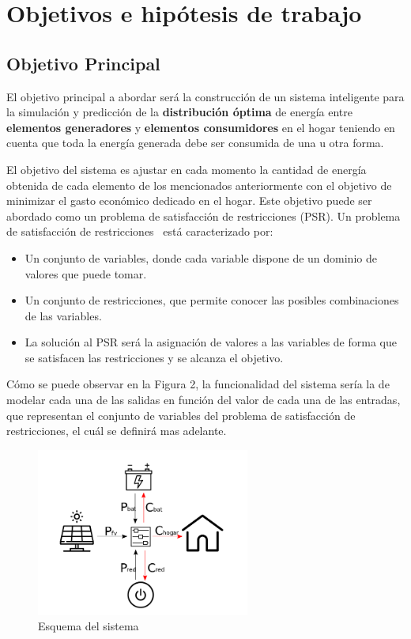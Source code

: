\chapter{Objetivos e hipótesis de trabajo}
\label{cap:Objetivo}


\section{Objetivo Principal}
El objetivo principal a abordar será la construcción de un sistema inteligente para la simulación y predicción de la \textbf{distribución óptima} de energía entre \textbf{elementos generadores} y \textbf{elementos consumidores} en el hogar teniendo en cuenta que toda la energía generada debe ser consumida de una u otra forma.

El objetivo del sistema es ajustar en cada momento la cantidad de energía obtenida de cada elemento de los mencionados anteriormente con el objetivo de minimizar el gasto económico dedicado en el hogar.
Este objetivo puede ser abordado como un problema de satisfacción de restricciones (PSR).
Un problema de satisfacción de restricciones~\cite{Russ06} está caracterizado por:
\begin{itemize}
	\item Un conjunto de variables, donde cada variable dispone de un dominio de valores que puede tomar.
	\item Un conjunto de restricciones, que permite conocer las posibles combinaciones de las variables.
	\item La solución al PSR será la asignación de valores a las variables de forma que se satisfacen las restricciones y se alcanza el objetivo.
\end{itemize} 
Cómo se puede observar en la Figura 2, la funcionalidad del sistema sería la de modelar cada una de las salidas en función del valor de cada una de las entradas, que representan el conjunto de variables del problema de satisfacción de restricciones, el cuál se definirá mas adelante.

\begin{figure}[!h]
	\centering
	\includegraphics[width=7cm]{figs/Esquema.png}
	\caption{Esquema del sistema}
\end{figure}

